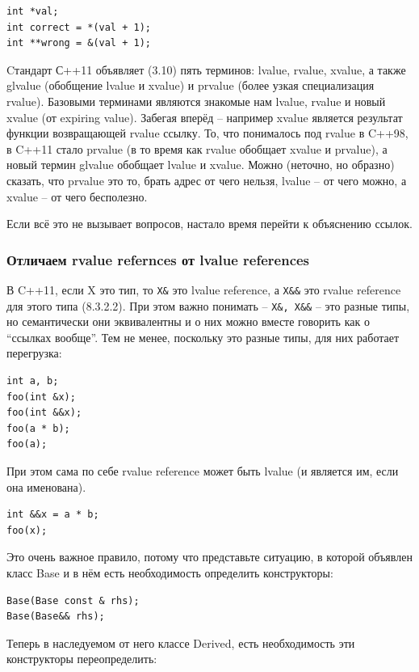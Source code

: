 \documentclass[a4paper,12pt,oneside]{article}
\begin{document}
\begin{lstlisting}
int *val;
int correct = *(val + 1);
int **wrong = &(val + 1);
\end{lstlisting}

Cтандарт С++11 объявляет (3.10) пять терминов: lvalue, rvalue, xvalue, а также glvalue (обобщение lvalue и xvalue) и prvalue (более узкая специализация rvalue). Базовыми терминами являются знакомые нам lvalue, rvalue и новый xvalue (от expiring value). Забегая вперёд -- например xvalue является результат функции возвращающей rvalue ссылку. То, что понималось под rvalue в C++98, в C++11 стало prvalue (в то время как rvalue обобщает xvalue и prvalue), а новый термин glvalue обобщает lvalue и xvalue. Можно (неточно, но образно) сказать, что prvalue это то, брать адрес от чего нельзя, lvalue -- от чего можно, а xvalue -- от чего бесполезно.

Если всё это не вызывает вопросов, настало время перейти к объяснению ссылок.

\subsubsection{Отличаем rvalue refernces от lvalue references}

В C++11, если X это тип, то \lstinline!X&! это lvalue reference, а \lstinline!X&&! это rvalue reference для этого типа (8.3.2.2). При этом важно понимать -- \lstinline!X&, X&&! -- это разные типы, но семантически они эквивалентны и о них можно вместе говорить как о ``ссылках вообще''. Тем не менее, поскольку это разные типы, для них работает перегрузка:

\begin{lstlisting}
int a, b;
foo(int &x);
foo(int &&x);
foo(a * b);
foo(a);
\end{lstlisting}

При этом сама по себе rvalue reference может быть lvalue (и является им, если она именована).

\begin{lstlisting}
int &&x = a * b;
foo(x);
\end{lstlisting}

Это очень важное правило, потому что представьте ситуацию, в которой объявлен класс Base и в нём есть необходимость определить конструкторы:

\begin{lstlisting}
Base(Base const & rhs);
Base(Base&& rhs);
\end{lstlisting}

Теперь в наследуемом от него классе Derived, есть необходимость эти конструкторы переопределить:
\end{document}
